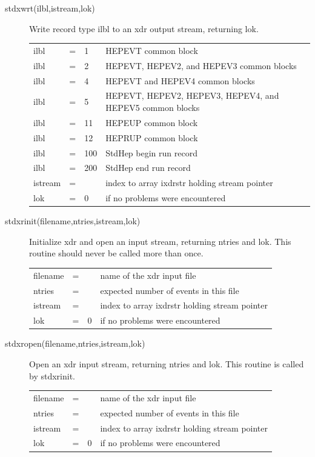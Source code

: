\begin{description}
\item[stdxwrt(ilbl,istream,lok)]
 Write record type ilbl to an xdr output stream, returning lok.

\begin{tabular}{lcll}
ilbl & = & 1   & HEPEVT common block \\
ilbl & = & 2   & HEPEVT, HEPEV2, and HEPEV3 common blocks \\
ilbl & = & 4   & HEPEVT and HEPEV4 common blocks \\
ilbl & = & 5   & HEPEVT, HEPEV2, HEPEV3, HEPEV4, and HEPEV5 common blocks \\
ilbl & = & 11  & HEPEUP common block \\
ilbl & = & 12  & HEPRUP common block \\
ilbl & = & 100 & StdHep begin run record \\
ilbl & = & 200 & StdHep end run record \\
istream & = &  & index to array ixdrstr holding stream pointer \\
lok  & = & 0   & if no problems were encountered \\
\end{tabular}

\item[stdxrinit(filename,ntries,istream,lok)]
 Initialize xdr and open an input stream, returning ntries and lok.
 This routine should never be called more than once.

\begin{tabular}{lcll}
filename & = &  & name of the xdr input file \\
ntries & = &  & expected number of events in this file \\
istream & = &  & index to array ixdrstr holding stream pointer \\
lok  & = & 0   & if no problems were encountered \\
\end{tabular}

\item[stdxropen(filename,ntries,istream,lok)]
 Open an xdr input stream, returning ntries and lok.
 This routine is called by stdxrinit.

\begin{tabular}{lcll}
filename & = &  & name of the xdr input file \\
ntries & = &  & expected number of events in this file \\
istream & = &  & index to array ixdrstr holding stream pointer \\
lok  & = & 0   & if no problems were encountered \\
\end{tabular}


\end{description}
